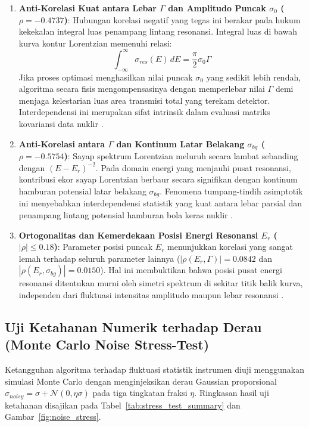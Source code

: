\begin{enumerate}
    \item \textbf{Anti-Korelasi Kuat antara Lebar $\Gamma$ dan Amplitudo Puncak $\sigma_0$ ($\rho = -0.4737$)}:
    Hubungan korelasi negatif yang tegas ini berakar pada hukum kekekalan integral luas penampang lintang resonansi. Integral luas di bawah kurva kontur Lorentzian memenuhi relasi:
    \begin{equation}
        \int_{-\infty}^{\infty} \sigma_{res}(E)\, dE = \frac{\pi}{2} \sigma_0 \Gamma
        \label{eq:area_integral}
    \end{equation}
    Jika proses optimasi menghasilkan nilai puncak $\sigma_0$ yang sedikit lebih rendah, algoritma secara fisis mengompensasinya dengan memperlebar nilai $\Gamma$ demi menjaga kelestarian luas area transmisi total yang terekam detektor. Interdependensi ini merupakan sifat intrinsik dalam evaluasi matriks kovariansi data nuklir \parencite{smith2004covariance,frohner2000evaluation}.
    \item \textbf{Anti-Korelasi antara $\Gamma$ dan Kontinum Latar Belakang $\sigma_{bg}$ ($\rho = -0.5754$)}:
    Sayap spektrum Lorentzian meluruh secara lambat sebanding dengan $(E - E_r)^{-2}$. Pada domain energi yang menjauhi pusat resonansi, kontribusi ekor sayap Lorentzian berbaur secara signifikan dengan kontinum hamburan potensial latar belakang $\sigma_{bg}$. Fenomena tumpang-tindih asimptotik ini menyebabkan interdependensi statistik yang kuat antara lebar parsial dan penampang lintang potensial hamburan bola keras nuklir \parencite{capote2009ripl,smith2004covariance}.
    \item \textbf{Ortogonalitas dan Kemerdekaan Posisi Energi Resonansi $E_r$ ($|\rho| \le 0.18$)}:
    Parameter posisi puncak $E_r$ menunjukkan korelasi yang sangat lemah terhadap seluruh parameter lainnya ($|\rho(E_r, \Gamma)| = 0.0842$ dan $|\rho(E_r, \sigma_{bg})| = 0.0150$). Hal ini membuktikan bahwa posisi pusat energi resonansi ditentukan murni oleh simetri spektrum di sekitar titik balik kurva, independen dari fluktuasi intensitas amplitudo maupun lebar resonansi \parencite{smith2004covariance,danon2018high}.
\end{enumerate}

\subsection*{Uji Ketahanan Numerik terhadap Derau (Monte Carlo Noise Stress-Test)}
Ketangguhan algoritma terhadap fluktuasi statistik instrumen diuji menggunakan simulasi Monte Carlo dengan menginjeksikan derau Gaussian proporsional $\sigma_{noisy} = \sigma + \mathcal{N}(0, \eta\sigma)$ pada tiga tingkatan fraksi $\eta$. Ringkasan hasil uji ketahanan disajikan pada Tabel~\ref{tab:stress_test_summary} dan Gambar~\ref{fig:noise_stress}.


